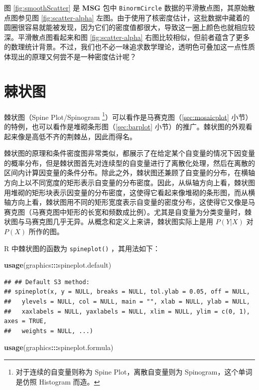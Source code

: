 \documentclass[
  b5paper,
  UTF8,twoside]{book}
\newenvironment{Shaded}{\begin{snugshade}}{\end{snugshade}}
\newcommand{\FunctionTok}[1]{\textcolor[rgb]{0.13,0.29,0.53}{\textbf{#1}}}
\newcommand{\NormalTok}[1]{#1}
\newcommand{\SpecialCharTok}[1]{\textcolor[rgb]{0.81,0.36,0.00}{\textbf{#1}}}
\begin{document}
图 \ref{fig:smoothScatter} 是 \textbf{MSG} 包中 \texttt{BinormCircle} 数据的平滑散点图，其原始散点图参见图 \ref{fig:scatter-alpha} 左图。由于使用了核密度估计，这批数据中藏着的圆圈很容易就能被发现，因为它们的密度值都很大，导致这一圈上颜色也就相应较深。平滑散点图看起来和图 \ref{fig:scatter-alpha} 右图比较相似，但前者蕴含了更多的数理统计背景。不过，我们也不必一味追求数学理论，透明色可叠加这一点性质体现出的原理又何尝不是一种密度估计呢？

\section{棘状图}\label{sec:spineplot}

棘状图（Spine Plot/Spinogram \footnote{对于连续的自变量则称为 Spine Plot，离散自变量则为 Spinogram，这个单词是仿照 Histogram 而造。}）可以看作是马赛克图（\ref{sec:mosaicplot} 小节）的特例，也可以看作是堆砌条形图（\ref{sec:barplot} 小节）的推广。棘状图的外观看起来像是高低不齐的荆棘丛，因此而得名。

棘状图的原理和条件密度图非常类似，都展示了在给定某个自变量的情况下因变量的概率分布，但是棘状图首先对连续型的自变量进行了离散化处理，然后在离散的区间内计算因变量的条件分布。除此之外，棘状图还兼顾了自变量的分布，在横轴方向上以不同宽度的矩形表示自变量的分布密度。因此，从纵轴方向上看，棘状图用堆砌的矩形块表示因变量的分布密度，这使得它看起来像堆砌的条形图，而从横轴方向上看，棘状图用不同的矩形宽度表示自变量的密度分布，这使得它又像是马赛克图（马赛克图中矩形的长宽和频数成比例）。尤其是自变量为分类变量时，棘状图与马赛克图几乎无异。从概念和定义上来讲，棘状图实际上是用 \(P(Y|X)\) 对 \(P(X)\) 所作的图。

R 中棘状图的函数为 \texttt{spineplot()} ，其用法如下：

\begin{Shaded}
\begin{Highlighting}[]
\FunctionTok{usage}\NormalTok{(graphics}\SpecialCharTok{:::}\NormalTok{spineplot.default)}
\end{Highlighting}
\end{Shaded}

\begin{verbatim}
## ## Default S3 method:
## spineplot(x, y = NULL, breaks = NULL, tol.ylab = 0.05, off = NULL,
##   ylevels = NULL, col = NULL, main = "", xlab = NULL, ylab = NULL,
##   xaxlabels = NULL, yaxlabels = NULL, xlim = NULL, ylim = c(0, 1), axes = TRUE,
##   weights = NULL, ...)
\end{verbatim}

\begin{Shaded}
\begin{Highlighting}[]
\FunctionTok{usage}\NormalTok{(graphics}\SpecialCharTok{:::}\NormalTok{spineplot.formula)}
\end{Highlighting}
\end{Shaded}
\end{document}
